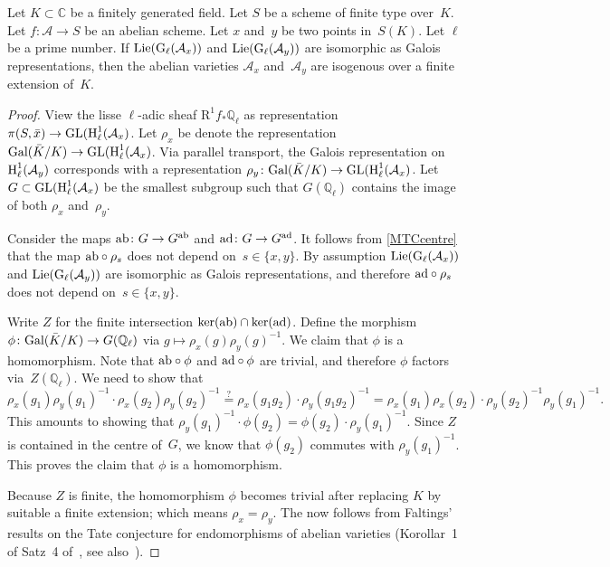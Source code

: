 \documentclass[10pt,twoside,leqno]{article}
\numberwithin{equation}{subsection}
\newcommand{\QQ}{\mathbb{Q}}
\newcommand{\QQl}{\QQ_{\ell}}
\newcommand{\CC}{\mathbb{C}}
\newcommand{\Gal}{\textnormal{Gal}}
\newcommand{\GL}{\textnormal{GL}}
\newcommand{\Lie}{\textnormal{Lie}}
\newcommand{\ab}{\textnormal{ab}}
\newcommand{\ad}{\textnormal{ad}}
\newcommand{\HH}{\textnormal{H}}
\newcommand{\Hl}{\HH_{\ell}}
\newcommand{\GG}{\textnormal{G}}
\newcommand{\Gl}{\GG_{\ell}}
\begin{document}
\begin{proposition} \label{twofib}
 Let \(K \subset \CC\) be a finitely generated field.
 Let \(S\) be a scheme of finite type over~\(K\).
 Let \(f \colon \mathcal{A} \to S\) be an abelian scheme.
 Let \(x\) and~\(y\) be two points in~\(S(K)\).
 Let \(\ell\) be a prime number.
 If \(\Lie(\Gl(\mathcal{A}_{x}))\) and \(\Lie(\Gl(\mathcal{A}_{y}))\)
 are isomorphic as Galois representations,
 then the abelian varieties \(\mathcal{A}_{x}\) and~\(\mathcal{A}_{y}\)
 are isogenous over a finite extension of~\(K\).
 \begin{proof}
  View the lisse \(\ell\)-adic sheaf \(\mathrm{R}^{1}f_{*}\QQl\)
  as representation
  \(\pi(S,\bar{x}) \to \GL(\Hl^{1}(\mathcal{A}_{x})\).
  Let \(\rho_{x}\) be denote the representation
  \(\Gal(\bar{K}/K) \to \GL(\Hl^{1}(\mathcal{A}_{x})\).
  Via parallel transport,
  the Galois representation on~\(\Hl^{1}(\mathcal{A}_{y})\)
  corresponds with a representation
  \(\rho_{y} \colon \Gal(\bar{K}/K) \to \GL(\Hl^{1}(\mathcal{A}_{x})\).
  Let \(G \subset \GL(\Hl^{1}(\mathcal{A}_{x})\) be the smallest
  subgroup such that \(G(\QQl)\) contains the image
  of both \(\rho_{x}\) and~\(\rho_{y}\).

  Consider the maps \(\ab \colon G \to G^{\ab}\)
  and \(\ad \colon G \to G^{\ad}\).
  It follows from \cref{MTCcentre} that
  the map \(\ab \circ \rho_{s}\) does not depend on~\(s \in \{x,y\}\).
  By assumption
  \(\Lie(\Gl(\mathcal{A}_{x}))\) and \(\Lie(\Gl(\mathcal{A}_{y}))\)
  are isomorphic as Galois representations,
  and therefore \(\ad \circ \rho_{s}\) does not depend on~\(s \in \{x,y\}\).

  Write \(Z\) for the finite intersection \(\ker(\ab) \cap \ker(\ad)\).
  Define the morphism \(\phi \colon \Gal(\bar{K}/K) \to G(\QQl)\)
  via \(g \mapsto \rho_{x}(g)\rho_{y}(g)^{-1}\).
  We claim that \(\phi\) is a homomorphism.
  Note that \(\ab \circ \phi\) and \(\ad \circ \phi\)
  are trivial, and therefore \(\phi\) factors via~\(Z(\QQl)\).
  We need to show that
  \[
   \rho_{x}(g_{1})\rho_{y}(g_{1})^{-1} \cdot \rho_{x}(g_{2})\rho_{y}(g_{2})^{-1}
   \stackrel{?}{=}
   \rho_{x}(g_{1}g_{2}) \cdot \rho_{y}(g_{1}g_{2})^{-1}
   =
   \rho_{x}(g_{1})\rho_{x}(g_{2}) \cdot
   \rho_{y}(g_{2})^{-1}\rho_{y}(g_{1})^{-1}.
  \]
  This amounts to showing that
  \(\rho_{y}(g_{1})^{-1} \cdot \phi(g_{2}) =
   \phi(g_{2}) \cdot \rho_{y}(g_{1})^{-1}\).
  Since \(Z\) is contained in the centre of~\(G\),
  we know that \(\phi(g_{2})\) commutes with \(\rho_{y}(g_{1})^{-1}\).
  This proves the claim that \(\phi\) is a homomorphism.

  Because \(Z\) is finite,
  the homomorphism \(\phi\) becomes trivial
  after replacing \(K\) by suitable a finite extension;
  which means \(\rho_{x} = \rho_{y}\).
  The  now follows from Faltings' results
  on the Tate conjecture for endomorphisms of abelian varieties
  (Korollar~1 of Satz~4 of~\cite{Fal83}, see also~\cite{Fal84}).
 \end{proof}
\end{proposition}
\end{document}

